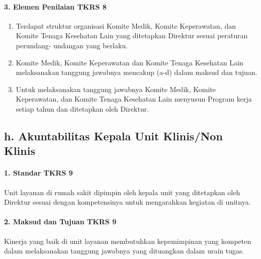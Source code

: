 \documentclass[
]{book}
\providecommand{\tightlist}{%
  \setlength{\itemsep}{0pt}\setlength{\parskip}{0pt}}
\begin{document}
\hypertarget{elemen-penilaian-tkrs-8}{%
\paragraph*{3. Elemen Penilaian TKRS 8}\label{elemen-penilaian-tkrs-8}}

\begin{enumerate}
\def\labelenumi{\alph{enumi}.}
\tightlist
\item
  Terdapat struktur organisasi Komite Medik, Komite Keperawatan, dan Komite Tenaga Kesehatan Lain yang ditetapkan Direktur sesuai peraturan perundang- undangan yang berlaku.
\item
  Komite Medik, Komite Keperawatan dan Komite Tenaga Kesehatan Lain melaksanakan tanggung jawabnya mencakup (a-d) dalam maksud dan tujuan.
\item
  Untuk melaksanakan tanggung jawabnya Komite Medik, Komite Keperawatan, dan Komite Tenaga Kesehatan Lain menyusun Program kerja setiap tahun dan ditetapkan oleh Direktur.
\end{enumerate}

\hypertarget{h.-akuntabilitas-kepala-unit-klinisnon-klinis}{%
\subsection*{h. Akuntabilitas Kepala Unit Klinis/Non Klinis}\label{h.-akuntabilitas-kepala-unit-klinisnon-klinis}}

\hypertarget{standar-tkrs-9}{%
\paragraph*{1. Standar TKRS 9}\label{standar-tkrs-9}}

Unit layanan di rumah sakit dipimpin oleh kepala unit yang ditetapkan oleh Direktur sesuai dengan kompetensinya untuk mengarahkan kegiatan di unitnya.

\hypertarget{maksud-dan-tujuan-tkrs-9}{%
\paragraph*{2. Maksud dan Tujuan TKRS 9}\label{maksud-dan-tujuan-tkrs-9}}

Kinerja yang baik di unit layanan membutuhkan kepemimpinan yang kompeten dalam melaksanakan tanggung jawabnya yang dituangkan dalam urain tugas.
\end{document}
